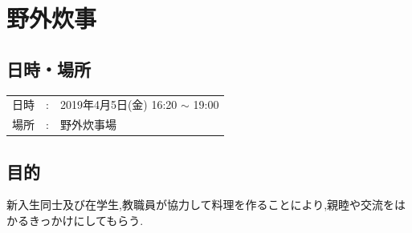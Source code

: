 %

\section{野外炊事}

\subsection{日時・場所}

\begin{tabular}{p{}rp{}}
  日時 & : & 2019年4月5日(金) 16:20 $\sim$ 19:00\\
  場所 & : & 野外炊事場
\end{tabular}

\subsection{目的}
新入生同士及び在学生,教職員が協力して料理を作ることにより,親睦や交流をはかるきっかけにしてもらう.

